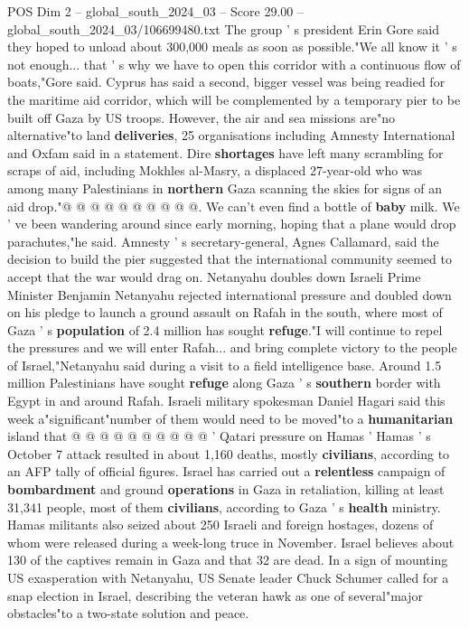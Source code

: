 \begin{textsample}{POS Dim 2 – global\_south\_2024\_03 – Score 29.00 – global\_south\_2024\_03/106699480.txt}
The group ' s president Erin Gore said they hoped to unload about 300,000 meals as soon as possible."We all know it ' s not enough... that ' s why we have to open this corridor with a continuous flow of boats,"Gore said.
Cyprus has said a second, bigger vessel was being readied for the maritime aid corridor, which will be complemented by a temporary pier to be built off Gaza by US troops.
However, the air and sea missions are"no alternative"to land \textbf{deliveries}, 25 organisations including Amnesty International and Oxfam said in a statement.
Dire \textbf{shortages} have left many scrambling for scraps of aid, including Mokhles al-Masry, a displaced 27-year-old who was among many Palestinians in \textbf{northern} Gaza scanning the skies for signs of an aid drop."@ @ @ @ @ @ @ @ @ @.
We can't even find a bottle of \textbf{baby} milk.
We ' ve been wandering around since early morning, hoping that a plane would drop parachutes,"he said.
Amnesty ' s secretary-general, Agnes Callamard, said the decision to build the pier suggested that the international community seemed to accept that the war would drag on.
Netanyahu doubles down Israeli Prime Minister Benjamin Netanyahu rejected international pressure and doubled down on his pledge to launch a ground assault on Rafah in the south, where most of Gaza ' s \textbf{population} of 2.4 million has sought \textbf{refuge}."I will continue to repel the pressures and we will enter Rafah... and bring complete victory to the people of Israel,"Netanyahu said during a visit to a field intelligence base.
Around 1.5 million Palestinians have sought \textbf{refuge} along Gaza ' s \textbf{southern} border with Egypt in and around Rafah.
Israeli military spokesman Daniel Hagari said this week a"significant"number of them would need to be moved"to a \textbf{humanitarian} island that @ @ @ @ @ @ @ @ @ @ ' Qatari pressure on Hamas ' Hamas ' s October 7 attack resulted in about 1,160 deaths, mostly \textbf{civilians}, according to an AFP tally of official figures.
Israel has carried out a \textbf{relentless} campaign of \textbf{bombardment} and ground \textbf{operations} in Gaza in retaliation, killing at least 31,341 people, most of them \textbf{civilians}, according to Gaza ' s \textbf{health} ministry.
Hamas militants also seized about 250 Israeli and foreign hostages, dozens of whom were released during a week-long truce in November.
Israel believes about 130 of the captives remain in Gaza and that 32 are dead.
In a sign of mounting US exasperation with Netanyahu, US Senate leader Chuck Schumer called for a snap election in Israel, describing the veteran hawk as one of several"major obstacles"to a two-state solution and peace.

\end{textsample}
